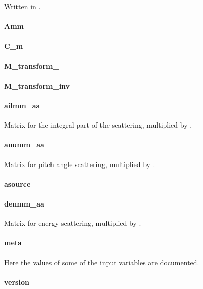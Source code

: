 Written in .

\paragraph{Amm}

\paragraph{C\_m}

\paragraph{M\_transform\_}

\paragraph{M\_transform\_inv}

\paragraph{ailmm\_aa}
Matrix for the integral part of the scattering, multiplied by
.

\paragraph{anumm\_aa}
Matrix for pitch angle scattering, multiplied by .

\paragraph{asource}

\paragraph{denmm\_aa}
Matrix for energy scattering, multiplied by .

\paragraph{meta}
Here the values of some of the input variables are documented.

\paragraph{version}

